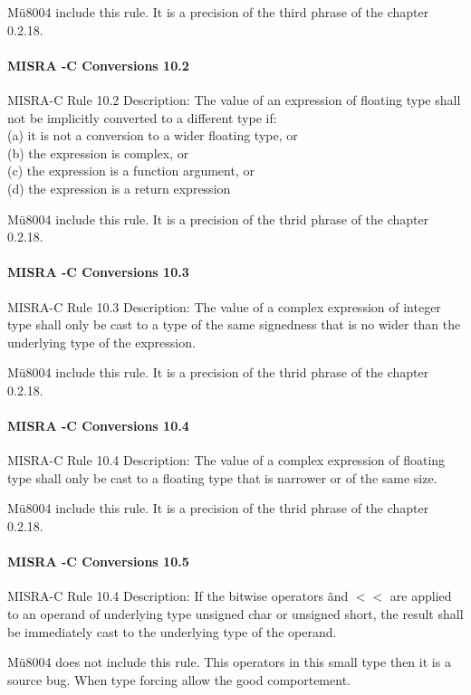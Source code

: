 Mü8004 include this rule. It is a precision of the third phrase of the chapter 0.2.18.

\paragraph{MISRA -C Conversions 10.2}
MISRA-C Rule 10.2 Description: The value of an expression of floating type shall not be implicitly
converted to a different type if:\\
(a) it is not a conversion to a wider floating type, or\\
(b) the expression is complex, or\\
(c) the expression is a function argument, or\\
(d) the expression is a return expression

Mü8004 include this rule. It is a precision of the thrid phrase of the chapter 0.2.18.

\paragraph{MISRA -C Conversions 10.3}
MISRA-C Rule 10.3 Description: The value of a complex expression of integer type shall only be
cast to a type of the same signedness that is no wider than the
underlying type of the expression.

Mü8004 include this rule. It is a precision of the thrid phrase of the chapter 0.2.18.

\paragraph{MISRA -C Conversions 10.4}
MISRA-C Rule 10.4 Description: The value of a complex expression of floating type shall only be cast to a floating type that is narrower or of the same size.

Mü8004 include this rule. It is a precision of the thrid phrase of the chapter 0.2.18.

\paragraph{MISRA -C Conversions 10.5}
MISRA-C Rule 10.4 Description: If the bitwise operators
\~ and $<<$ are applied to an operand of underlying type
unsigned char or unsigned short, the result shall
be immediately cast to the underlying type of the operand.

Mü8004 does not include this rule. This operators in this small type then it is a source bug. When type forcing allow the good comportement.

